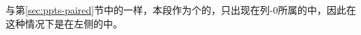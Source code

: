 %
% 

与第\ref{sec:ppts-paired}节中的\postenv{}一样，本段作为\npaired{}个\parapag{}的\postenv{}，只出现在列-0所属的\parapag{}中，因此在这种情况下是在左侧的\parapag{}中。
